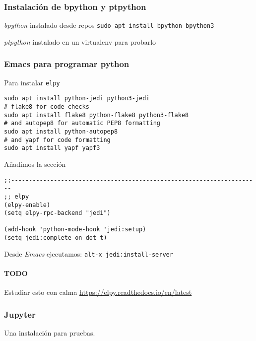 \documentclass[
  12pt,
  spanish,
]{article}
\begin{document}
\hypertarget{instalaciuxf3n-de-bpython-y-ptpython}{%
\subsubsection{Instalación de bpython y
ptpython}\label{instalaciuxf3n-de-bpython-y-ptpython}}

\emph{bpython} instalado desde repos
\texttt{sudo\ apt\ install\ bpython\ bpython3}

\emph{ptpython} instalado en un virtualenv para probarlo

\hypertarget{emacs-para-programar-python}{%
\subsubsection{Emacs para programar
python}\label{emacs-para-programar-python}}

Para instalar \texttt{elpy}

\begin{verbatim}
sudo apt install python-jedi python3-jedi
# flake8 for code checks
sudo apt install flake8 python-flake8 python3-flake8
# and autopep8 for automatic PEP8 formatting
sudo apt install python-autopep8
# and yapf for code formatting
sudo apt install yapf yapf3
\end{verbatim}

Añadimos la sección

\begin{verbatim}
;;----------------------------------------------------------------------
;; elpy
(elpy-enable)
(setq elpy-rpc-backend "jedi")

(add-hook 'python-mode-hook 'jedi:setup)
(setq jedi:complete-on-dot t)
\end{verbatim}

Desde \emph{Emacs} ejecutamos: \texttt{alt-x\ jedi:install-server}

\hypertarget{todo}{%
\paragraph{TODO}\label{todo}}

Estudiar esto con calma \url{https://elpy.readthedocs.io/en/latest}

\hypertarget{jupyter}{%
\subsubsection{Jupyter}\label{jupyter}}

Una instalación para pruebas.
\end{document}
